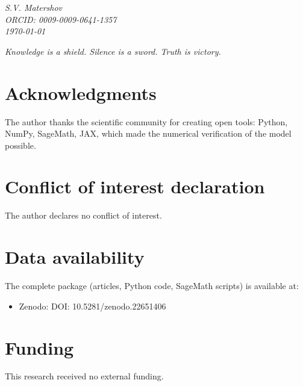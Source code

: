 \documentclass[12pt,a4paper,twoside]{article}
\theoremstyle{definition}
\begin{document}
\vspace{0.5cm}
\begin{flushright}
\textit{S.V. Matershov}\\
\textit{ORCID: 0009-0009-0641-1357}\\
\textit{\today}
\end{flushright}

\vspace{0.3cm}
\begin{center}
\begin{tcolorbox}[
  enhanced,
  colback=lightgray,
  colframe=gold,
  boxrule=0.6pt,
  arc=3pt,
  width=0.7\textwidth,
  center
]
\centering\itshape\color{deepgray}
Knowledge is a shield. Silence is a sword. Truth is victory.
\end{tcolorbox}
\end{center}

\section*{Acknowledgments}
The author thanks the scientific community for creating open tools: Python, NumPy, SageMath, JAX, which made the numerical verification of the model possible.

\section*{Conflict of interest declaration}
The author declares no conflict of interest.

\section*{Data availability}
The complete package (articles, Python code, SageMath scripts) is available at:
\begin{itemize}
    \item Zenodo: DOI: 10.5281/zenodo.22651406
\end{itemize}
                                                    
\section*{Funding}
This research received no external funding.
\end{document}
